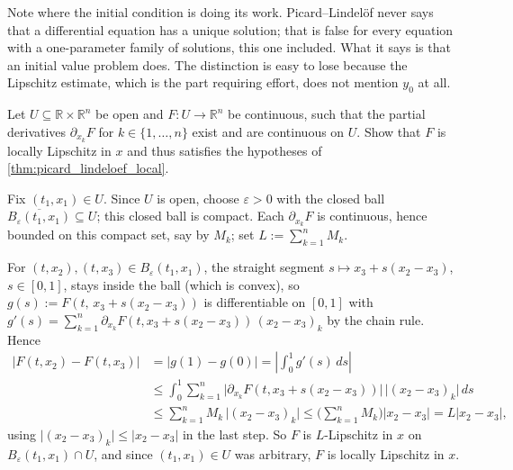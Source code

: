 \begin{ainote}
Note where the initial condition is doing its work. Picard--Lindelöf never says that a
differential equation has a unique solution; that is false for every equation with a
one-parameter family of solutions, this one included. What it says is that an initial value
problem does. The distinction is easy to lose because the Lipschitz estimate, which is the part
requiring effort, does not mention $y_0$ at all.
\end{ainote}

\begin{exercise}
\label{ex:c1_implies_locally_lipschitz}
Let $U \subseteq \mathbb{R}\times\mathbb{R}^n$ be open and $F : U \to \mathbb{R}^n$ be
continuous, such that the partial derivatives $\partial_{x_k}F$ for $k \in \{1,\dots,n\}$ exist
and are continuous on $U$. Show that $F$ is locally Lipschitz in $x$ and thus satisfies the
hypotheses of \cref{thm:picard_lindeloef_local}.
\end{exercise}

\begin{exercisesolution}
Fix $(t_1,x_1) \in U$. Since $U$ is open, choose $\varepsilon>0$ with the closed ball
$\overline{B_\varepsilon(t_1,x_1)} \subseteq U$; this closed ball is compact. Each
$\partial_{x_k}F$ is continuous, hence bounded on this compact set, say by $M_k$; set
$L := \sum_{k=1}^n M_k$.

For $(t,x_2),(t,x_3) \in B_\varepsilon(t_1,x_1)$, the straight segment
$s\mapsto x_3+s(x_2-x_3)$, $s\in[0,1]$, stays inside the ball (which is convex), so
$g(s) := F(t,\,x_3+s(x_2-x_3))$ is differentiable on $[0,1]$ with
$g'(s) = \sum_{k=1}^n \partial_{x_k}F(t,x_3+s(x_2-x_3))\,(x_2-x_3)_k$ by the chain rule. Hence
\begin{align*}
|F(t,x_2)-F(t,x_3)| &= |g(1)-g(0)|
  = \left|\int_0^1 g'(s)\,ds\right| \\
  &\leq \int_0^1 \sum_{k=1}^n \lvert\partial_{x_k}F(t,x_3+s(x_2-x_3))\rvert
    \,\lvert(x_2-x_3)_k\rvert\,ds \\
  &\leq \sum_{k=1}^n M_k\,\lvert(x_2-x_3)_k\rvert
  \leq \Big(\sum_{k=1}^n M_k\Big)|x_2-x_3| = L|x_2-x_3|,
\end{align*}
using $\lvert(x_2-x_3)_k\rvert \leq |x_2-x_3|$ in the last step. So $F$ is
$L$-Lipschitz in $x$ on $B_\varepsilon(t_1,x_1)\cap U$, and since $(t_1,x_1) \in U$ was
arbitrary, $F$ is locally Lipschitz in $x$.
\end{exercisesolution}

